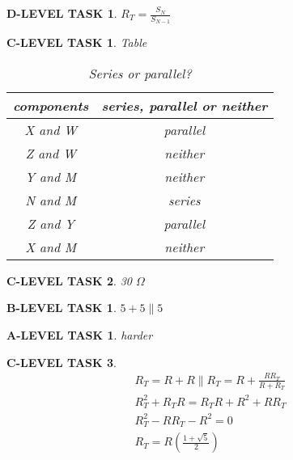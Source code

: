 \documentclass{book}
\numberwithin{equation}{section}
\newtheorem{alevel}{A-LEVEL TASK}
\newtheorem{blevel}{B-LEVEL TASK}
\newtheorem{clevel}{C-LEVEL TASK}
\newtheorem{dlevel}{D-LEVEL TASK}
\theoremstyle{definition}
\begin{document}
\begin{dlevel} $R_T=\frac{S_N}{S_{N-1}}$\end{dlevel}

\begin{clevel} Table\par 
\begin{table}[H]
\begin{center}
\begin{tabular}{|c|c|} \hline
components & series, parallel or neither \\ \hline
X and W & parallel	\\ \hline
Z and W &neither	\\ \hline
Y and M &neither	\\ \hline
N and M &series	\\ \hline
Z and Y &parallel	\\ \hline
X and M &neither	\\ \hline
\end{tabular}
\caption{Series or parallel?}
\label{T:3SP}
\end{center}
\end{table}
\end{clevel}

\begin{clevel}30 $\Omega$\end{clevel}
\begin{blevel}$5+5\parallel 5$\end{blevel}
\begin{alevel}harder\end{alevel}
\begin{clevel} 
\begin{align*}
R_T=R+R\parallel R_T=R+\frac{RR_T}{R+R_T}\\
R_T^2+R_TR=R_TR+R^2+RR_T\\
R_T^2-RR_T-R^2=0\\
R_T=R(\frac{1+\sqrt{5}}{2})
\end{align*}
\end{clevel}
\end{document}
